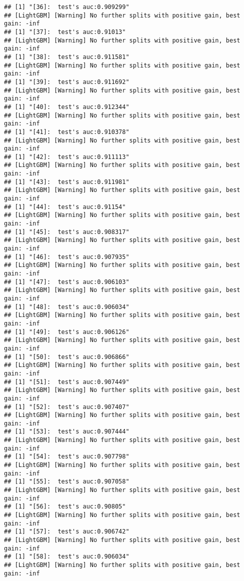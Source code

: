 \documentclass[
]{article}
\begin{document}
\begin{verbatim}
## [1] "[36]:  test's auc:0.909299"
## [LightGBM] [Warning] No further splits with positive gain, best gain: -inf
## [1] "[37]:  test's auc:0.91013"
## [LightGBM] [Warning] No further splits with positive gain, best gain: -inf
## [1] "[38]:  test's auc:0.911581"
## [LightGBM] [Warning] No further splits with positive gain, best gain: -inf
## [1] "[39]:  test's auc:0.911692"
## [LightGBM] [Warning] No further splits with positive gain, best gain: -inf
## [1] "[40]:  test's auc:0.912344"
## [LightGBM] [Warning] No further splits with positive gain, best gain: -inf
## [1] "[41]:  test's auc:0.910378"
## [LightGBM] [Warning] No further splits with positive gain, best gain: -inf
## [1] "[42]:  test's auc:0.911113"
## [LightGBM] [Warning] No further splits with positive gain, best gain: -inf
## [1] "[43]:  test's auc:0.911981"
## [LightGBM] [Warning] No further splits with positive gain, best gain: -inf
## [1] "[44]:  test's auc:0.91154"
## [LightGBM] [Warning] No further splits with positive gain, best gain: -inf
## [1] "[45]:  test's auc:0.908317"
## [LightGBM] [Warning] No further splits with positive gain, best gain: -inf
## [1] "[46]:  test's auc:0.907935"
## [LightGBM] [Warning] No further splits with positive gain, best gain: -inf
## [1] "[47]:  test's auc:0.906103"
## [LightGBM] [Warning] No further splits with positive gain, best gain: -inf
## [1] "[48]:  test's auc:0.906034"
## [LightGBM] [Warning] No further splits with positive gain, best gain: -inf
## [1] "[49]:  test's auc:0.906126"
## [LightGBM] [Warning] No further splits with positive gain, best gain: -inf
## [1] "[50]:  test's auc:0.906866"
## [LightGBM] [Warning] No further splits with positive gain, best gain: -inf
## [1] "[51]:  test's auc:0.907449"
## [LightGBM] [Warning] No further splits with positive gain, best gain: -inf
## [1] "[52]:  test's auc:0.907407"
## [LightGBM] [Warning] No further splits with positive gain, best gain: -inf
## [1] "[53]:  test's auc:0.907444"
## [LightGBM] [Warning] No further splits with positive gain, best gain: -inf
## [1] "[54]:  test's auc:0.907798"
## [LightGBM] [Warning] No further splits with positive gain, best gain: -inf
## [1] "[55]:  test's auc:0.907058"
## [LightGBM] [Warning] No further splits with positive gain, best gain: -inf
## [1] "[56]:  test's auc:0.90805"
## [LightGBM] [Warning] No further splits with positive gain, best gain: -inf
## [1] "[57]:  test's auc:0.906742"
## [LightGBM] [Warning] No further splits with positive gain, best gain: -inf
## [1] "[58]:  test's auc:0.906034"
## [LightGBM] [Warning] No further splits with positive gain, best gain: -inf

\end{verbatim}
\end{document}

